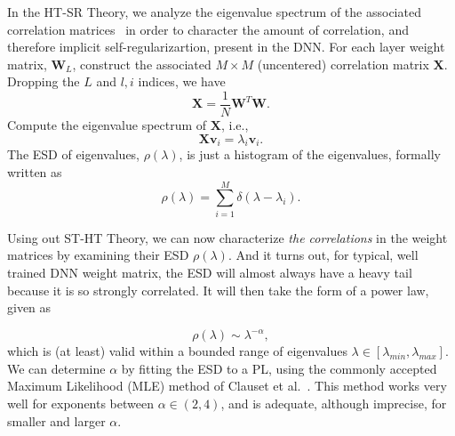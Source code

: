 In the HT-SR Theory, we analyze the eigenvalue spectrum of the associated correlation matrices~\cite{MM18_TR}
in order to character the amount of correlation, and therefore implicit self-regularizartion, present in the DNN.
For each layer weight matrix, $\mathbf{W}_{L}$, construct the associated $M\times M$ (uncentered) correlation matrix $\mathbf{X}$. 
Dropping the $L$ and $l,i$ indices, we have
$$
\mathbf{X} = \frac{1}{N}\mathbf{W}^{T}\mathbf{W}.
$$
Compute the eigenvalue spectrum of $\mathbf{X}$, i.e.,
$$ \mathbf{X}\mathbf{v}_{i}=\lambda_{i}\mathbf{v}_{i} .  $$
The ESD of eigenvalues, $\rho(\lambda)$, is just a histogram of the eigenvalues, formally written as
\begin{equation}
\rho(\lambda)=\sum\limits_{i=1}^{M}\delta(\lambda-\lambda_{i})  .
\label{eqn:eigenval_hist}
\end{equation}

Using out ST-HT Theory, we can now characterize \emph{the correlations} in the weight matrices by examining their ESD $\rho(\lambda)$.
And it turns out, for  typical, well trained DNN weight matrix, the ESD will almost always have a heavy tail  because it is so strongly correlated.  
It will then take the form of a power law, given as

\begin{equation}
\rho(\lambda)\sim\lambda^{-\alpha}  ,
\label{eqn:eigenval_pl}
\end{equation}
which is (at least) valid within a bounded range of eigenvalues $\lambda\in[\lambda_{min},\lambda_{max}]$.  
%
We can determine $\alpha$ by fitting the   ESD to a PL, using the commonly accepted Maximum Likelihood (MLE) method of Clauset et al.~\cite{CSN09_powerlaw,ABP14}.
This method works very well for exponents between $\alpha\in(2,4)$, and is adequate, although imprecise, for smaller and larger $\alpha$. 

